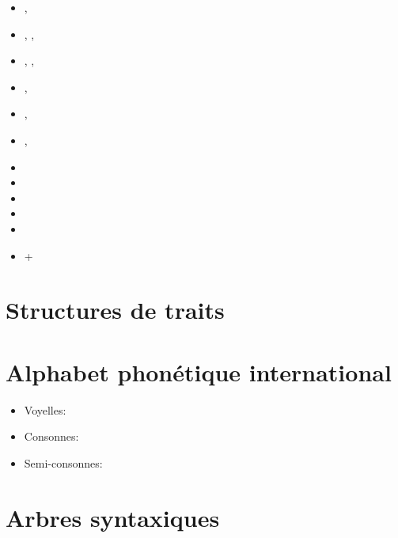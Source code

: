 \documentclass{article}
\begin{document}
\begin{multicols}{3}
\begin{itemize}
	\item \Prepar, \Prox
	\item \Incep, \Fin, \Cont
	\item \Obstr, \Stop, \Excess
	\item \Caus, 
	\item \Liqu, 
	\item \Perm, 
	\item \Son
	\item \Manif
	\item \Involv
	\item {}
	\item {}
	\item \Q\Anti\Magn+\Anti\Ver
\end{itemize}
\end{multicols}




\section{Structures de traits}



\section{Alphabet phonétique international}

\begin{itemize}
	\item Voyelles: 
	\item Consonnes: 
	\item Semi-consonnes: \textipa{[j4w]}
\end{itemize}

\section{Arbres syntaxiques}
\end{document}
